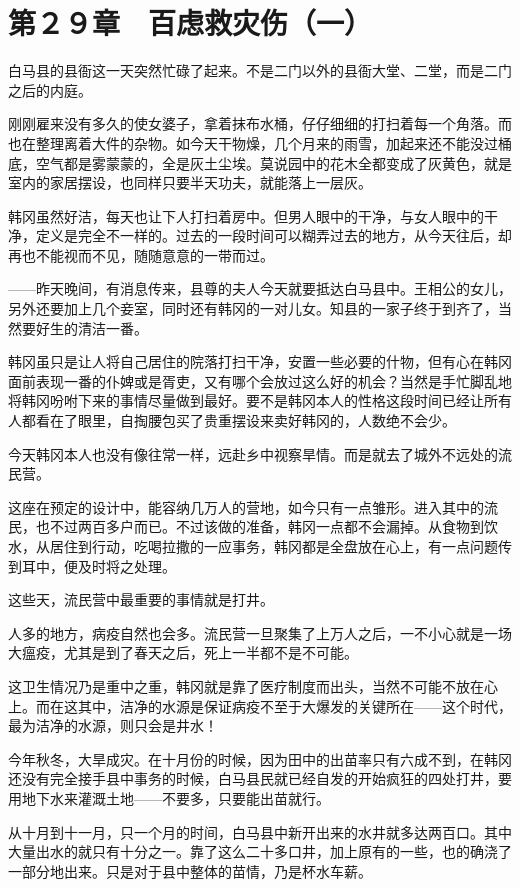 \section{第２９章　百虑救灾伤（一）}

白马县的县衙这一天突然忙碌了起来。不是二门以外的县衙大堂、二堂，而是二门之后的内庭。

刚刚雇来没有多久的使女婆子，拿着抹布水桶，仔仔细细的打扫着每一个角落。而也在整理离着大件的杂物。如今天干物燥，几个月来的雨雪，加起来还不能没过桶底，空气都是雾蒙蒙的，全是灰土尘埃。莫说园中的花木全都变成了灰黄色，就是室内的家居摆设，也同样只要半天功夫，就能落上一层灰。

韩冈虽然好洁，每天也让下人打扫着房中。但男人眼中的干净，与女人眼中的干净，定义是完全不一样的。过去的一段时间可以糊弄过去的地方，从今天往后，却再也不能视而不见，随随意意的一带而过。

——昨天晚间，有消息传来，县尊的夫人今天就要抵达白马县中。王相公的女儿，另外还要加上几个妾室，同时还有韩冈的一对儿女。知县的一家子终于到齐了，当然要好生的清洁一番。

韩冈虽只是让人将自己居住的院落打扫干净，安置一些必要的什物，但有心在韩冈面前表现一番的仆婢或是胥吏，又有哪个会放过这么好的机会？当然是手忙脚乱地将韩冈吩咐下来的事情尽量做到最好。要不是韩冈本人的性格这段时间已经让所有人都看在了眼里，自掏腰包买了贵重摆设来卖好韩冈的，人数绝不会少。

今天韩冈本人也没有像往常一样，远赴乡中视察旱情。而是就去了城外不远处的流民营。

这座在预定的设计中，能容纳几万人的营地，如今只有一点雏形。进入其中的流民，也不过两百多户而已。不过该做的准备，韩冈一点都不会漏掉。从食物到饮水，从居住到行动，吃喝拉撒的一应事务，韩冈都是全盘放在心上，有一点问题传到耳中，便及时将之处理。

这些天，流民营中最重要的事情就是打井。

人多的地方，病疫自然也会多。流民营一旦聚集了上万人之后，一不小心就是一场大瘟疫，尤其是到了春天之后，死上一半都不是不可能。

这卫生情况乃是重中之重，韩冈就是靠了医疗制度而出头，当然不可能不放在心上。而在这其中，洁净的水源是保证病疫不至于大爆发的关键所在——这个时代，最为洁净的水源，则只会是井水！

今年秋冬，大旱成灾。在十月份的时候，因为田中的出苗率只有六成不到，在韩冈还没有完全接手县中事务的时候，白马县民就已经自发的开始疯狂的四处打井，要用地下水来灌溉土地——不要多，只要能出苗就行。

从十月到十一月，只一个月的时间，白马县中新开出来的水井就多达两百口。其中大量出水的就只有十分之一。靠了这么二十多口井，加上原有的一些，也的确浇了一部分地出来。只是对于县中整体的苗情，乃是杯水车薪。


